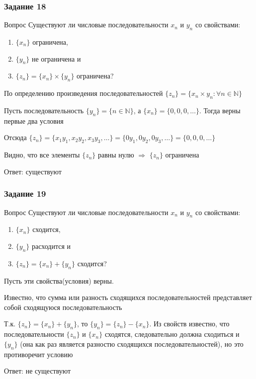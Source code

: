 \documentclass[8pt]{beamer}
\begin{document}
  \begin{frame}
    \frametitle{Задание 18}

    \begin{block}{Вопрос}
      Существуют ли числовые последовательности $x_n$ и $y_n$ со свойствами:
      \begin{enumerate}
        \item $\{x_n\}$ ограничена,
        \item $\{y_n\}$ не ограничена и
        \item $\{z_n\} = \{x_n\} \times \{y_n\}$ ограничена?
      \end{enumerate}
    \end{block}

    По определению произведения последовательностей $\{z_n\} = \{x_n \times y_n: \forall n \in \mathbb{N}\}$

    Пусть последовательность $\{y_n\} = \{n \in \mathbb{N}\}$, а $\{x_n\} = \{0, 0, 0, \dots\}$. Тогда верны первые два условия
  
    Отсюда $\{z_n\} = \{x_1y_1, x_2y_2, x_3y_3, \dots\} = \{0y_1, 0y_2, 0y_3, \dots\} = \{0, 0, 0, \dots\}$

    Видно, что все элементы $\{z_n\}$ равны нулю $\Rightarrow$ $\{z_n\}$ ограничена

    \begin{flushright}
      Ответ: существуют
    \end{flushright}
  \end{frame}

  \begin{frame}
    \frametitle{Задание 19}

    \begin{block}{Вопрос}
      Существуют ли числовые последовательности $x_n$ и $y_n$ со свойствами:
      \begin{enumerate}
        \item $\{x_n\}$ сходится,
        \item $\{y_n\}$ расходится и
        \item $\{z_n\} = \{x_n\} + \{y_n\}$ сходится?
      \end{enumerate}
    \end{block}

    Пусть эти свойства(условия) верны.

    Известно, что сумма или разность сходящихся последовательностей представляет собой сходящуюся последовательность
  
    Т.к. $\{z_n\} = \{x_n\} + \{y_n\}$, то $\{y_n\} = \{z_n\} - \{x_n\}$. Из свойств известно, что
    последовательности $\{z_n\}$ и $\{x_n\}$ сходятся, следовательно должна сходиться и $\{y_n\}$
    (она как раз является разностю сходящихся последовательностей), но это противоречит условию

    \begin{flushright}
      Ответ: не существуют
    \end{flushright}
  \end{frame}
\end{document}

